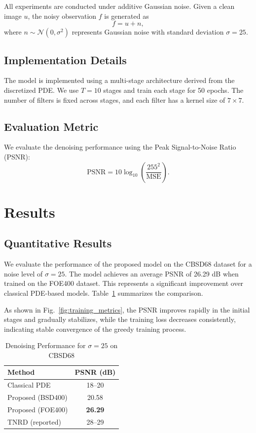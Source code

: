 \documentclass[conference]{IEEEtran}
\begin{document}
All experiments are conducted under additive Gaussian noise. Given a clean image $u$, the noisy observation $f$ is generated as
\begin{equation}
f = u + n,
\end{equation}
where $n \sim \mathcal{N}(0, \sigma^2)$ represents Gaussian noise with standard deviation $\sigma = 25$.

\subsection{Implementation Details}

The model is implemented using a multi-stage architecture derived from the discretized PDE. We use $T = 10$ stages and train each stage for 50 epochs. The number of filters is fixed across stages, and each filter has a kernel size of $7 \times 7$.

\subsection{Evaluation Metric}

We evaluate the denoising performance using the Peak Signal-to-Noise Ratio (PSNR):
\begin{equation}
\text{PSNR} = 10 \log_{10} \left( \frac{255^2}{\text{MSE}} \right).
\end{equation}

\section{Results}

\subsection{Quantitative Results}

We evaluate the performance of the proposed model on the CBSD68 dataset for a noise level of $\sigma = 25$. The model achieves an average PSNR of 26.29 dB when trained on the FOE400 dataset. This represents a significant improvement over classical PDE-based models. Table~\ref{tab:results} summarizes the comparison.

As shown in Fig.~\ref{fig:training_metrics}, the PSNR improves rapidly in the initial stages and gradually stabilizes, while the training loss decreases consistently, indicating stable convergence of the greedy training process.

\begin{table}[h]
\centering
\caption{Denoising Performance for $\sigma = 25$ on CBSD68}
\label{tab:results}
\begin{tabular}{l c}
\hline
Method & PSNR (dB) \\
\hline
Classical PDE & 18--20 \\
Proposed (BSD400) & 20.58 \\
Proposed (FOE400) & \textbf{26.29} \\
TNRD (reported) & 28--29 \\
\hline
\end{tabular}
\end{table}
\end{document}
